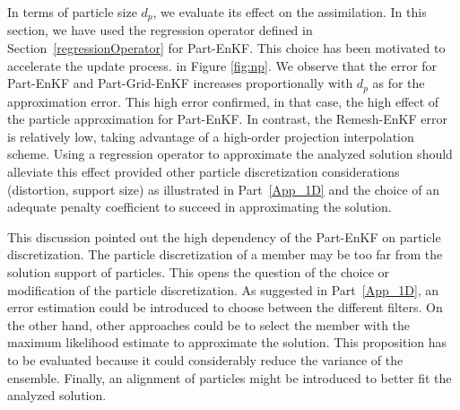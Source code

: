 In terms of particle size $d_p$, we evaluate its effect on the assimilation. In this section, we have used the regression operator defined in Section~\ref{regressionOperator} for Part-EnKF. This choice has been motivated to accelerate the update process.
in Figure \ref{fig:np}. We observe that the error for Part-EnKF and Part-Grid-EnKF increases proportionally with $d_p$ as for the approximation error. This high error confirmed, in that case, the high effect of the particle approximation for Part-EnKF. In contrast, the Remesh-EnKF error is relatively low, taking advantage of a high-order projection interpolation scheme. Using a regression operator to approximate the analyzed solution should alleviate this effect provided other particle discretization considerations (distortion, support size) as illustrated in Part~\ref{App_1D} and the choice of an adequate penalty coefficient to succeed in approximating the solution.


This discussion pointed out the high dependency of the Part-EnKF on particle discretization. The particle discretization of a member may be too far from the solution support of particles. This opens the question of the choice or modification of the particle discretization. As suggested in Part~\ref{App_1D}, an error estimation could be introduced to choose between the different filters. On the other hand, other approaches could be to select the member with the maximum likelihood estimate to approximate the solution. This proposition has to be evaluated because it could considerably reduce the variance of the ensemble. Finally, an alignment of particles might be introduced to better fit the analyzed solution.

\newpage

